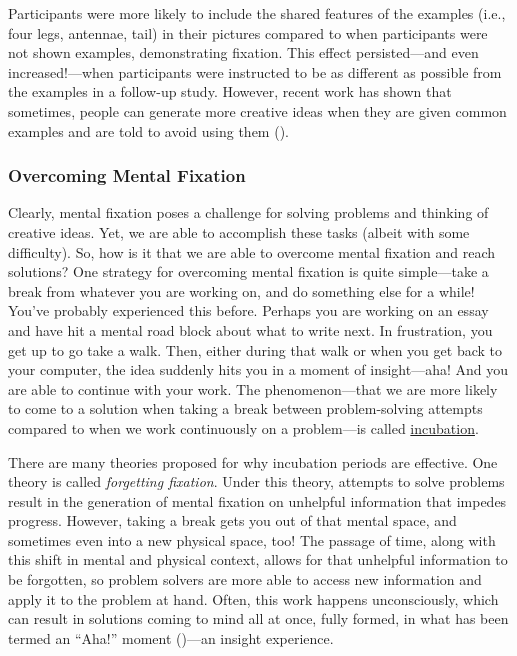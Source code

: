 \documentclass[
]{krantz}
\begin{document}
Participants were more likely to include the shared features of the examples (i.e., four legs, antennae, tail) in their pictures compared to when participants were not shown examples, demonstrating fixation. This effect persisted---and even increased!---when participants were instructed to be as different as possible from the examples in a follow-up study. However, recent work has shown that sometimes, people can generate more creative ideas when they are given common examples and are told to avoid using them ().

\subsubsection*{Overcoming Mental Fixation}\label{overcoming-mental-fixation}


Clearly, mental fixation poses a challenge for solving problems and thinking of creative ideas. Yet, we are able to accomplish these tasks (albeit with some difficulty). So, how is it that we are able to overcome mental fixation and reach solutions? One strategy for overcoming mental fixation is quite simple---take a break from whatever you are working on, and do something else for a while! You've probably experienced this before. Perhaps you are working on an essay and have hit a mental road block about what to write next. In frustration, you get up to go take a walk. Then, either during that walk or when you get back to your computer, the idea suddenly hits you in a moment of insight---aha! And you are able to continue with your work. The phenomenon---that we are more likely to come to a solution when taking a break between problem-solving attempts compared to when we work continuously on a problem---is called \hyperref[incubation]{incubation}.

There are many theories proposed for why incubation periods are effective. One theory is called \emph{forgetting fixation}. Under this theory, attempts to solve problems result in the generation of mental fixation on unhelpful information that impedes progress. However, taking a break gets you out of that mental space, and sometimes even into a new physical space, too! The passage of time, along with this shift in mental and physical context, allows for that unhelpful information to be forgotten, so problem solvers are more able to access new information and apply it to the problem at hand. Often, this work happens unconsciously, which can result in solutions coming to mind all at once, fully formed, in what has been termed an ``Aha!'' moment ()---an insight experience.
\end{document}
